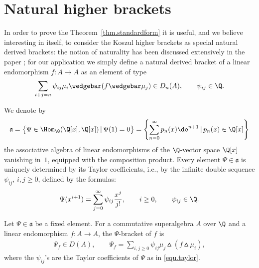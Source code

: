 \section{Natural higher brackets}
\label{sec.natural}

In order to prove the Theorem~\ref{thm.standardform} it is useful, and we believe interesting in itself, to consider the Koszul higher brackets
as special natural derived brackets: the notion of naturality has been discussed extensively in the paper \cite{markl1}; for our application we simply def\/ine a natural derived bracket of a linear endomorphism $f\colon A\to A$ as an element of type
\begin{gather*}\sum_{i+j=n}\psi_{ij} \mu_i\wedgebar (f\wedgebar\mu_j)\in D_n(A),\qquad \psi_{ij}\in \Q .\end{gather*}

We denote by
\begin{gather*}
\mathfrak{a}=\big\{\Psi\in \Hom_{\Q}(\Q[x],\Q[x])\,|\, \Psi(1)=0\big\}
=\left\{\sum_{n=0}^{\infty}p_n(x)\de^{n+1}\,|\, p_n(x)\in \Q[x]\right\}\end{gather*}
the associative algebra of linear endomorphisms of the $\Q$-vector space
$\Q[x]$ vanishing in~$1$, equipped with the composition product.
Every element $\Psi\in \mathfrak{a}$ is uniquely determined by its Taylor coef\/f\/icients,
i.e., by the inf\/inite double sequence $\psi_{ij}$, $i,j\ge 0$, def\/ined by the formulas:
\begin{gather}\label{equ.taylor}
\Psi(x^{i+1})=\sum_{j=0}^{\infty}\psi_{ij}\frac{x^j}{j!},\qquad i\ge 0,\qquad \psi_{ij}\in\Q .
\end{gather}

\begin{Definition} Let $\Psi\in \mathfrak{a}$ be a f\/ixed element.
For a commutative superalgebra $A$ over $\Q$ and a linear endomorphism $f\colon A\to A$,
the $\Psi$-bracket of $f$ is
\begin{gather*} \Psi_f\in D(A),\qquad
\Psi_f=\sum_{i,j\ge 0}\psi_{ij} \mu_j\wedgebar (f\wedgebar\mu_i),
\end{gather*}
where the $\psi_{ij}$'s are the Taylor coef\/f\/icients of $\Psi$ as in \eqref{equ.taylor}.
\end{Definition}

